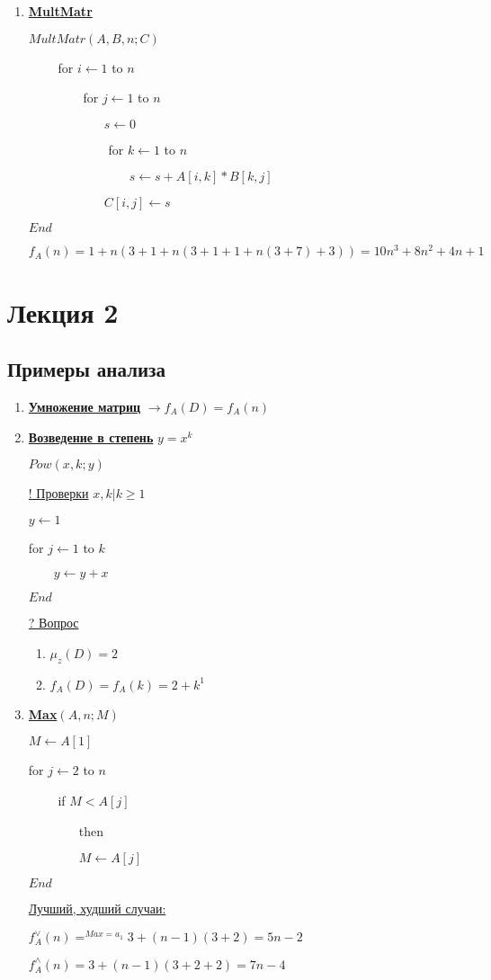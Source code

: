 \documentclass[12pt]{report}
\begin{document}
\begin{enumerate}
		\item\underline{\textbf{MultMatr}}\par
		$MultMatr(A, B, n; C)$\par
		$\qquad$ for $i \leftarrow 1$ to $n$\par
		$\qquad\qquad$ for $ j \leftarrow 1$ to $n$\par
		$\qquad\qquad\qquad s \leftarrow 0$\par
		$\qquad\qquad\qquad$ for $k \leftarrow 1$ to $n$\par
		$\qquad\qquad\qquad\qquad s \leftarrow s + A[i,k]*B[k,j]$\par
		$\qquad\qquad\qquad C[i,j] \leftarrow s$\par
		$End$\par
		$f_{A}(n) = 1 + n(3 + 1 + n(3 + 1 + 1 + n(3 + 7) + 3)) = 10n^{3} + 8n^{2} + 4n + 1$\par
	\end{enumerate}

	\chapter*{Лекция 2}
	\section*{Примеры анализа}
	\begin{enumerate}
		\item \underline{\textbf{Умножение матриц}} $\rightarrow f_{A}(D) = f_{A}(n)$
		\item \underline{\textbf{Возведение в степень}} $y = x^{k}$\par
		$Pow(x,k;y)$\par
		\underline{! Проверки} $x, k | k \geq 1$\par
		$y \leftarrow 1$\par
		for $j \leftarrow 1$ to $k$\par
		$\qquad y \leftarrow y + x$\par
		$End$\par
		\underline{? Вопрос}
		\begin{enumerate}
			\item $\mu_{z}(D)=2$
			\item $f_{A}(D)=f_{A}(k)=2+k^{1}$
		\end{enumerate}
		\item \underline{\textbf{Max$(A, n; M)$}}\par
		$M \leftarrow A[1]$\par
		for $j \leftarrow 2$ to $n$\par
		$\qquad$ if $M < A[j]$\par
		$\qquad\qquad$then\par
		$\qquad\qquad M \leftarrow A[j]$\par
		$End$\par
		\underline{Лучший, худший случаи:}\par
		$f_{A}^{\vee}(n)=^{Max=a_{1}} 3 + (n-1)(3+2)=5n-2$\par
		$f_{A}^{\wedge}(n)=3+(n-1)(3+2+2)=7n-4$\par
	\end{enumerate}
\end{document}
